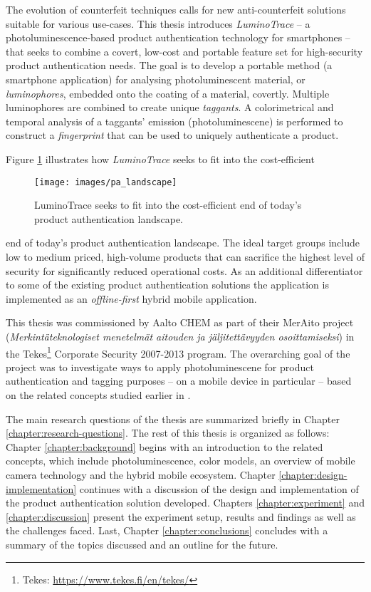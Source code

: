 \documentclass[thesis.tex]{subfiles}
\begin{document}
\enlargethispage{2\baselineskip}
The evolution of counterfeit techniques calls for new anti-counterfeit solutions suitable for various use-cases. This thesis introduces \emph{LuminoTrace} -- a photoluminescence-based product authentication technology for smartphones -- that seeks to combine a covert, low-cost and portable feature set for high-security product authentication needs. The goal is to develop a portable method (a smartphone application) for analysing photoluminescent material, or \emph{luminophores}, embedded onto the coating of a material, covertly. Multiple luminophores are combined to create unique \emph{taggants}. A colorimetrical and temporal analysis of a taggants' emission (photoluminescene) is performed to construct a \emph{fingerprint} that can be used to uniquely authenticate a product.

Figure \ref{figure:production_authentication_landscape} illustrates how \emph{LuminoTrace} seeks to fit into the cost-efficient

\begin{figure}[h!]
\centering \texttt{[image: images/pa\_landscape]}
\vspace{-8mm}
\caption{LuminoTrace seeks to fit into the cost-efficient end of today's product authentication landscape.}
\label{figure:production_authentication_landscape}
\end{figure}

\noindent end of today's product authentication landscape. The ideal target groups include low to medium priced, high-volume products that can sacrifice the highest level of security for significantly reduced operational costs. As an additional differentiator to some of the existing product authentication solutions the application is implemented as an \emph{offline-first} hybrid mobile application.

This thesis was commissioned by Aalto CHEM as part of their MerAito project (\emph{Merkintäteknologiset menetelmät aitouden ja jäljitettävyyden osoittamiseksi}) in the Tekes\footnote{Tekes: \url{https://www.tekes.fi/en/tekes/}} Corporate Security 2007-2013 program. The overarching goal of the project was to investigate ways to apply photoluminescene for product authentication and tagging purposes -- on a mobile device in particular -- based on the related concepts studied earlier in \cite{kuosmanen}.

The main research questions of the thesis are summarized briefly in Chapter \ref{chapter:research-questions}. The rest of this thesis is organized as follows: Chapter \ref{chapter:background} begins with an introduction to the related concepts, which include photoluminescence, color models, an overview of mobile camera technology and the hybrid mobile ecosystem. Chapter \ref{chapter:design-implementation} continues with a discussion of the design and implementation of the product authentication solution developed. Chapters \ref{chapter:experiment} and \ref{chapter:discussion} present the experiment setup, results and findings as well as the challenges faced. Last, Chapter \ref{chapter:conclusions} concludes with a summary of the topics discussed and an outline for the future.
\end{document}
